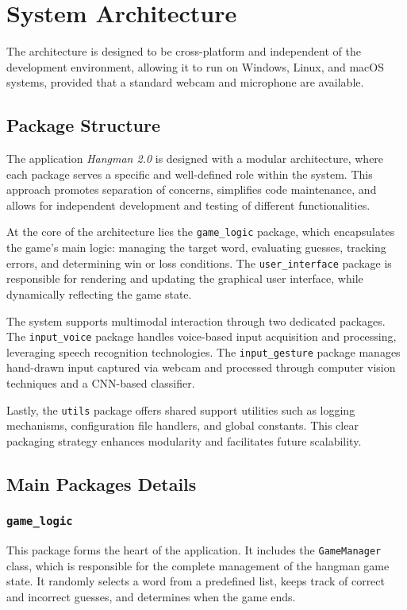 \section{System Architecture}
The architecture is designed to be cross-platform and independent of the development environment, allowing it to run on Windows, Linux, and macOS systems, provided that a standard webcam and microphone are available.

\subsection{Package Structure}

The application \textit{Hangman 2.0} is designed with a modular architecture, where each package serves a specific and well-defined role within the system. This approach promotes separation of concerns, simplifies code maintenance, and allows for independent development and testing of different functionalities.

At the core of the architecture lies the \texttt{game\_logic} package, which encapsulates the game's main logic: managing the target word, evaluating guesses, tracking errors, and determining win or loss conditions. The \texttt{user\_interface} package is responsible for rendering and updating the graphical user interface, while dynamically reflecting the game state.

The system supports multimodal interaction through two dedicated packages. The \texttt{input\_voice} package handles voice-based input acquisition and processing, leveraging speech recognition technologies. The \texttt{input\_gesture} package manages hand-drawn input captured via webcam and processed through computer vision techniques and a CNN-based classifier.

Lastly, the \texttt{utils} package offers shared support utilities such as logging mechanisms, configuration file handlers, and global constants. This clear packaging strategy enhances modularity and facilitates future scalability.

\subsection{Main Packages Details}

\subsubsection{\texttt{game\_logic}}
This package forms the heart of the application. It includes the \texttt{GameManager} class, which is responsible for the complete management of the hangman game state. It randomly selects a word from a predefined list, keeps track of correct and incorrect guesses, and determines when the game ends.

